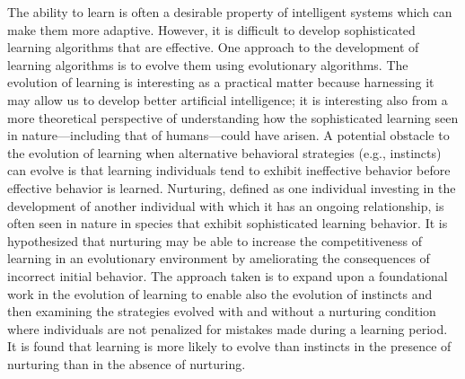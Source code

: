 The ability to learn is often a desirable property of intelligent systems which can make them more adaptive.
However, it is difficult to develop sophisticated learning algorithms that are effective.
One approach to the development of learning algorithms is to evolve them using evolutionary algorithms.
The evolution of learning is interesting as a practical matter because harnessing it may allow us to develop better artificial intelligence;
it is interesting also from a more theoretical perspective of understanding how the sophisticated learning seen in nature---including that of humans---could have arisen.
A potential obstacle to the evolution of learning when alternative behavioral strategies (e.g., instincts) can evolve is that learning individuals tend to exhibit ineffective behavior before effective behavior is learned.
Nurturing, defined as one individual investing in the development of another individual with which it has an ongoing relationship, is often seen in nature in species that exhibit sophisticated learning behavior.
It is hypothesized that nurturing may be able to increase the competitiveness of learning in an evolutionary environment by ameliorating the consequences of incorrect initial behavior.
The approach taken is to expand upon a foundational work in the evolution of learning to enable also the evolution of instincts and then examining the strategies evolved with and without a nurturing condition where individuals are not penalized for mistakes made during a learning period.
It is found that learning is more likely to evolve than instincts in the presence of nurturing than in the absence of nurturing.